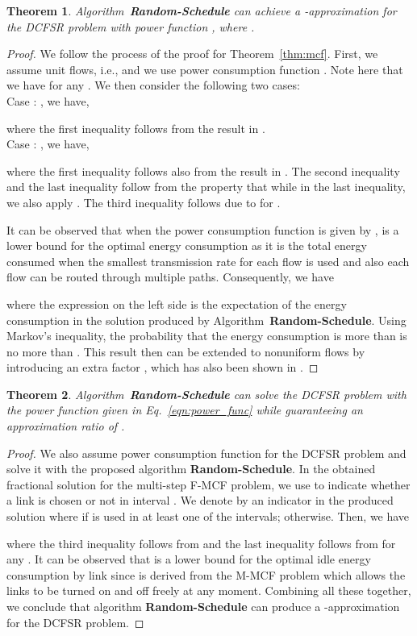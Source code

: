 \documentclass[10pt, conference, compsocconf]{IEEEtran}
\newtheorem{theorem}{Theorem}
\begin{document}
\begin{theorem}
 Algorithm~\textbf{Random-Schedule} can achieve a -approximation for the DCFSR problem with power function , where .
\end{theorem}

\begin{proof}
We follow the process of the proof for Theorem~\ref{thm:mcf}. First, we assume unit flows, i.e.,  and we use power consumption function . Note here that we have  for any . We then consider the following two cases:\\
Case : , we have,

where the first inequality follows from the result in \cite{Andrews_Fernandez-SS-2010}.\\
Case : , we have,

where the first inequality follows also from the result in \cite{Andrews_Fernandez-SS-2010}. The second inequality and the last inequality follow from the property that  while in the last inequality, we also apply . The third inequality follows due to  for . 

It can be observed that when the power consumption function is given by ,  is a lower bound for the optimal energy consumption as it is the total energy consumed when the smallest transmission rate for each flow is used and also each flow can be routed through multiple paths. Consequently, we have

where the expression on the left side is the expectation of the energy consumption in the solution produced by Algorithm~\textbf{Random-Schedule}. Using Markov's inequality, the probability that the energy consumption is more than  is no more than . This result then can be extended to nonuniform flows by introducing an extra factor , which has also been shown in \cite{Andrews_Fernandez-SS-2010}.
\end{proof}

\begin{theorem}
Algorithm~\textbf{Random-Schedule} can solve the DCFSR problem with the power function given in Eq.~\ref{eqn:power_func} while guaranteeing an approximation ratio  of .
\end{theorem}
\begin{proof}
We also assume power consumption function  for the DCFSR problem and solve it with the proposed algorithm \textbf{Random-Schedule}. In the obtained fractional solution for the multi-step F-MCF problem, we use  to indicate whether a link  is chosen or not in interval . We denote by  an indicator in the produced solution where  if  is used in at least one of the intervals;  otherwise. Then, we have

where the third inequality follows from  and the last inequality follows from  for any . It can be observed that  is a lower bound for the optimal idle energy consumption by link  since  is derived from the M-MCF problem which allows the links to be turned on and off freely at any moment. Combining all these together, we conclude that algorithm \textbf{Random-Schedule} can produce a -approximation for the DCFSR problem.
\end{proof}
\end{document}
